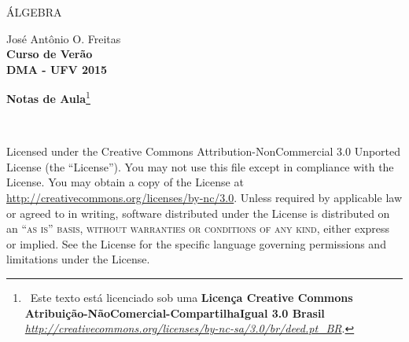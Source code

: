 \begin{titlepage}
\begin{center}

\vspace*{5cm}

\par\normalfont\fontsize{35}{35}\sffamily\selectfont
\'ALGEBRA\par %
\vspace*{1cm}
{\Huge Jos\'e Ant\^onio O. Freitas}\\
\vspace*{1cm}
\fontsize{18pt}{18pt}\selectfont\textbf{{Curso de Ver\~ao}\\ {DMA - UFV 2015}}

\vspace*{2.5cm}
{\fontsize{14pt}{14pt}\selectfont
   \textbf{Notas de Aula}\footnote{\ccbyncsa\ Este texto est\'a licenciado sob uma \textbf{Licen\c{c}a Creative Commons Atribui\c{c}\~ao-N\~aoComercial-CompartilhaIgual 3.0 Brasil} \href{http://creativecommons.org/licenses/by-nc-sa/3.0/br/deed.pt\_BR}{\textit{http://creativecommons.org/licenses/by-nc-sa/3.0/br/deed.pt\_BR}}.}
   }


\vfill

\end{center}
\end{titlepage}
~\vfill

\thispagestyle{empty}

\noindent Licensed under the Creative Commons Attribution-NonCommercial 3.0 Unported License (the ``License''). You may not use this file except in compliance with the License. You may obtain a copy of the License at \url{http://creativecommons.org/licenses/by-nc/3.0}. Unless required by applicable law or agreed to in writing, software distributed under the License is distributed on an \textsc{``as is'' basis, without warranties or conditions of any kind}, either express or implied. See the License for the specific language governing permissions and limitations under the License.\\ %